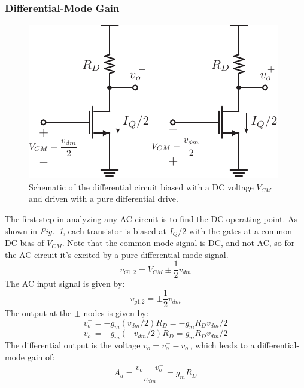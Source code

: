 \subsubsection{Differential-Mode Gain}
\begin{figure}[tb]
\centering
\includegraphics[scale=1]{Diff_ss_gain.pdf}
\caption{Schematic of the differential circuit biased with a DC voltage $V_{CM}$ and driven with a pure differential drive.}
\label{fig:Diff_ss_gain.pdf}
\end{figure}
The first step in analyzing any AC circuit is to find the DC operating point.  As shown in \emph{Fig.~\ref{fig:Diff_ss_gain.pdf}}, each transistor is biased at $I_Q/2$ with the gates at a common DC bias of $V_{CM}$.  Note that the common-mode signal is DC, and not AC, so for the AC circuit it's excited by a pure differential-mode signal.
    \begin{equation}
        {v_{G1.2}} = {V_{CM}} \pm \frac{1}{2}{v_{dm}}
    \end{equation}
The AC input signal is given by:
    \begin{equation}
        {v_{g1.2}} = \pm \frac{1}{2}{v_{dm}}
    \end{equation}
The output at the $\pm$ nodes is given by:
    \begin{equation}
        {v_{o}^-} = - {g_m}({v_{dm}}/2){R_D} =  - {g_m}{R_D}{v_{dm}}/2
    \end{equation}
    \begin{equation} 
        {v_{o}^+} = - {g_m}( - {v_{dm}}/2){R_D} = {g_m}{R_D}{v_{dm}}/2 
    \end{equation}
The differential output is the voltage $v_o = v_o^+ - v_o^-$, which leads to a differential-mode gain of:
    \begin{equation} 
        {A_d} = \frac{{{v_{o}^+} - {v_{o}^-}}}{{{v_{dm}}}} = {g_m}{R_D}
    \end{equation}
